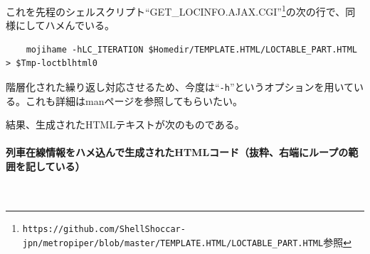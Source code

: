 これを先程のシェルスクリプト``GET\_{}LOCINFO.AJAX.CGI''\footnote{\verb|https://github.com/ShellShoccar-jpn/metropiper/blob/master/TEMPLATE.HTML/LOCTABLE_PART.HTML|参照}の次の行で、同様にしてハメんでいる。\\
\begin{frameboxit}{160.0mm}
\begin{verbatim}
	mojihame -hLC_ITERATION $Homedir/TEMPLATE.HTML/LOCTABLE_PART.HTML > $Tmp-loctblhtml0
\end{verbatim}
\end{frameboxit}
階層化された繰り返し対応させるため、今度は``\verb|-h|''というオプションを用いている。これも詳細はmanページを参照してもらいたい。

結果、生成されたHTMLテキストが次のものである。
\paragraph*{列車在線情報をハメ込んで生成されたHTMLコード（抜粋、右端にループの範囲を記している）} 　\\
